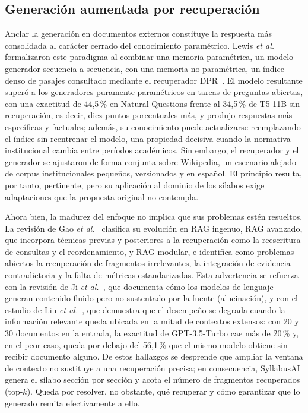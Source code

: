 \subsection{Generación aumentada por recuperación}
Anclar la generación en documentos externos constituye la respuesta más consolidada al carácter cerrado del conocimiento paramétrico. Lewis \textit{et al.}~\cite{lewis2020rag} formalizaron este paradigma al combinar una memoria paramétrica, un modelo generador secuencia a secuencia, con una memoria no paramétrica, un índice denso de pasajes consultado mediante el recuperador DPR~\cite{karpukhin2020dpr}. El modelo resultante superó a los generadores puramente paramétricos en tareas de preguntas abiertas, con una exactitud de 44,5\,\% en Natural Questions frente al 34,5\,\% de T5-11B sin recuperación, es decir, diez puntos porcentuales más, y produjo respuestas más específicas y factuales; además, su conocimiento puede actualizarse reemplazando el índice sin reentrenar el modelo, una propiedad decisiva cuando la normativa institucional cambia entre períodos académicos. Sin embargo, el recuperador y el generador se ajustaron de forma conjunta sobre Wikipedia, un escenario alejado de corpus institucionales pequeños, versionados y en español. El principio resulta, por tanto, pertinente, pero su aplicación al dominio de los sílabos exige adaptaciones que la propuesta original no contempla.

Ahora bien, la madurez del enfoque no implica que sus problemas estén resueltos. La revisión de Gao \textit{et al.}~\cite{gao2023ragsurvey} clasifica su evolución en RAG ingenuo, RAG avanzado, que incorpora técnicas previas y posteriores a la recuperación como la reescritura de consultas y el reordenamiento, y RAG modular, e identifica como problemas abiertos la recuperación de fragmentos irrelevantes, la integración de evidencia contradictoria y la falta de métricas estandarizadas. Esta advertencia se refuerza con la revisión de Ji \textit{et al.}~\cite{ji2023hallucination}, que documenta cómo los modelos de lenguaje generan contenido fluido pero no sustentado por la fuente (alucinación), y con el estudio de Liu \textit{et al.}~\cite{liu2024lost}, que demuestra que el desempeño se degrada cuando la información relevante queda ubicada en la mitad de contextos extensos: con 20 y 30 documentos en la entrada, la exactitud de GPT-3.5-Turbo cae más de 20\,\% y, en el peor caso, queda por debajo del 56,1\,\% que el mismo modelo obtiene sin recibir documento alguno. De estos hallazgos se desprende que ampliar la ventana de contexto no sustituye a una recuperación precisa; en consecuencia, SyllabusAI genera el sílabo sección por sección y acota el número de fragmentos recuperados (top-$k$). Queda por resolver, no obstante, qué recuperar y cómo garantizar que lo generado remita efectivamente a ello.

